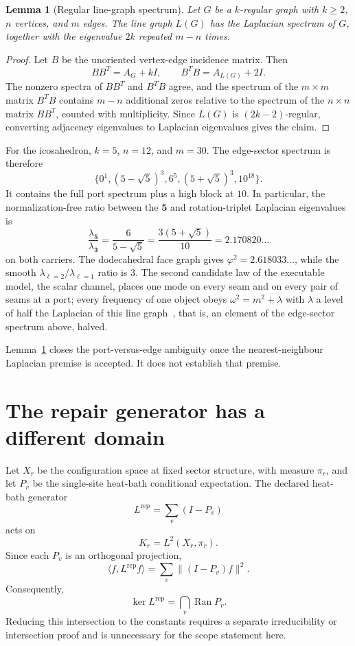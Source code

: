 \documentclass[11pt]{article}
\newtheorem{lemma}[theorem]{Lemma}
\theoremstyle{remark}
\begin{document}
\begin{lemma}[Regular line-graph spectrum]
\label{lem:linegraph}
Let \(G\) be a \(k\)-regular graph with \(k\geq2\), \(n\) vertices, and \(m\)
edges. The
line graph \(L(G)\) has the Laplacian spectrum of \(G\), together with the
eigenvalue \(2k\) repeated \(m-n\) times.
\end{lemma}

\begin{proof}
Let \(B\) be the unoriented vertex-edge incidence matrix. Then
\[
BB^T=A_G+kI,
\qquad
B^TB=A_{L(G)}+2I.
\]
The nonzero spectra of \(BB^T\) and \(B^TB\) agree, and the spectrum of the
\(m\times m\) matrix \(B^TB\) contains \(m-n\) additional zeros relative to
the spectrum of the \(n\times n\) matrix \(BB^T\), counted with
multiplicity. Since \(L(G)\) is \((2k-2)\)-regular, converting adjacency
eigenvalues to Laplacian eigenvalues gives the claim.
\end{proof}

For the icosahedron, \(k=5\), \(n=12\), and \(m=30\). The edge-sector
spectrum is therefore
\[
\{0^1,(5-\sqrt5)^3,6^5,(5+\sqrt5)^3,10^{18}\}.
\]
It contains the full port spectrum plus a high block at \(10\). In
particular, the normalization-free ratio between the \(\mathbf5\) and
rotation-triplet Laplacian eigenvalues is
\[
\frac{\lambda_{\mathbf5}}{\lambda_{\mathbf3}}
=\frac6{5-\sqrt5}
=\frac{3(5+\sqrt5)}{10}
=2.170820\ldots
\]
on both carriers. The dodecahedral face graph gives
\(\varphi^2=2.618033\ldots\), while the smooth
\(\lambda_{\ell=2}/\lambda_{\ell=1}\) ratio is \(3\). The second candidate
law of the executable model, the scalar channel, places one mode on every seam and
on every pair of seams at a port; every frequency of one object obeys
\(\omega^2=m^2+\lambda\) with \(\lambda\) a level of half the Laplacian of
this line graph~\cite{ophmodel}, that is, an element of the edge-sector
spectrum above, halved.

Lemma~\ref{lem:linegraph} closes the port-versus-edge ambiguity once the
nearest-neighbour Laplacian premise is accepted. It does not establish that
premise.

\section{The repair generator has a different domain}

Let \(X_r\) be the configuration space at fixed sector structure, with
measure \(\pi_r\), and let \(P_v\) be the single-site heat-bath conditional
expectation. The declared heat-bath generator
\[
L^{\mathrm{rep}}=\sum_v(I-P_v)
\]
acts on
\[
K_r=L^2(X_r,\pi_r).
\]
Since each \(P_v\) is an orthogonal projection,
\[
\langle f,L^{\mathrm{rep}}f\rangle
=\sum_v\|(I-P_v)f\|^2.
\]
Consequently,
\[
\ker L^{\mathrm{rep}}=\bigcap_v\operatorname{Ran}P_v.
\]
Reducing this intersection to the constants requires a separate
irreducibility or intersection proof and is unnecessary for the scope
statement here.
\end{document}
